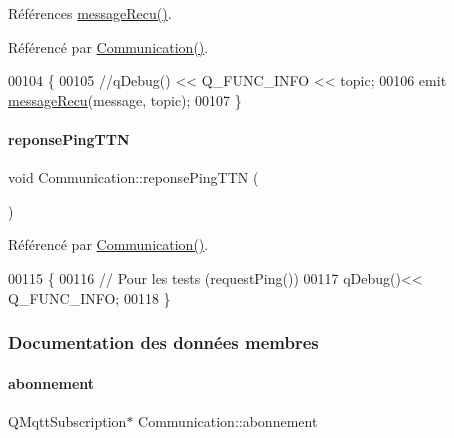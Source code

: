 Références \hyperlink{class_communication_a83865ed4092e263f42669dff0582b7e1}{message\+Recu()}.



Référencé par \hyperlink{class_communication_a7376830f5598b7e3c0eb4434a8a8766e}{Communication()}.


\begin{DoxyCode}
00104 \{
00105     \textcolor{comment}{//qDebug() << Q\_FUNC\_INFO << topic;}
00106     emit \hyperlink{class_communication_a83865ed4092e263f42669dff0582b7e1}{messageRecu}(message, topic);
00107 \}
\end{DoxyCode}
\mbox{\label{class_communication_a2921a3a80cdcb10f7f63c3bd779d7129}} 
\paragraph{\texorpdfstring{reponse\+Ping\+T\+TN}{reponsePingTTN}}
{\footnotesize\ttfamily void Communication\+::reponse\+Ping\+T\+TN (\begin{DoxyParamCaption}{ }\end{DoxyParamCaption})\hspace{0.3cm}{\ttfamily [slot]}}



Référencé par \hyperlink{class_communication_a7376830f5598b7e3c0eb4434a8a8766e}{Communication()}.


\begin{DoxyCode}
00115 \{
00116     \textcolor{comment}{// Pour les tests (requestPing())}
00117     qDebug()<< Q\_FUNC\_INFO;
00118 \}
\end{DoxyCode}


\subsubsection{Documentation des données membres}
\mbox{\label{class_communication_af29011664fbb15b9fb41ce37b70a694f}} 
\paragraph{\texorpdfstring{abonnement}{abonnement}}
{\footnotesize\ttfamily Q\+Mqtt\+Subscription$\ast$ Communication\+::abonnement\hspace{0.3cm}{\ttfamily [private]}}



